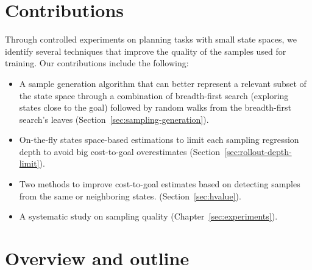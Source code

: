 \section{Contributions}
\label{sec:intro_contributions}

Through controlled experiments on planning tasks with small state spaces, we identify several techniques that improve the quality of the samples used for training. Our contributions include the following:

\begin{itemize}
    \item A sample generation algorithm that can better represent a relevant subset of the state space through a combination of breadth-first search (exploring states close to the goal) followed by random walks from the breadth-first search's leaves (Section~\ref{sec:sampling-generation}).
    \item On-the-fly states space-based estimations to limit each sampling regression depth to avoid big cost-to-goal overestimates (Section~\ref{sec:rollout-depth-limit}).
    \item Two methods to improve cost-to-goal estimates based on detecting samples from the same or neighboring states. (Section~\ref{sec:hvalue}).
    \item A systematic study on sampling quality (Chapter~\ref{sec:experiments}).
\end{itemize}

\section{Overview and outline}
\label{sec:intro_outline}

